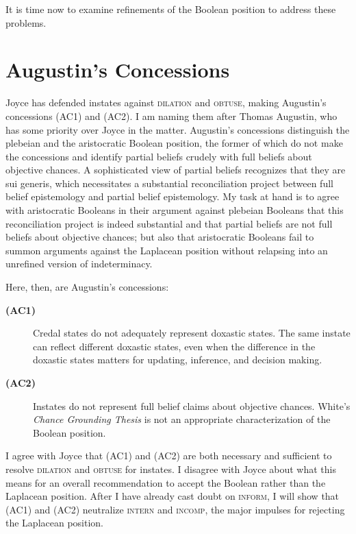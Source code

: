\documentclass[12pt]{article}
\begin{document}
It is time now to examine refinements of the Boolean position to
address these problems.

\section{Augustin's Concessions}
\label{AugustinsConcessions}

Joyce has defended instates against \textsc{dilation} and
\textsc{obtuse}, making Augustin's concessions (AC1) and (AC2). I am
naming them after Thomas Augustin, who has some priority over Joyce in
the matter. Augustin's concessions distinguish the plebeian and the
aristocratic Boolean position, the former of which do not make the
concessions and identify partial beliefs crudely with full beliefs
about objective chances. A sophisticated view of partial beliefs
recognizes that they are sui generis, which necessitates a substantial
reconciliation project between full belief epistemology and partial
belief epistemology. My task at hand is to agree with aristocratic
Booleans in their argument against plebeian Booleans that this
reconciliation project is indeed substantial and that partial beliefs
are not full beliefs about objective chances; but also that
aristocratic Booleans fail to summon arguments against the Laplacean
position without relapsing into an unrefined version of indeterminacy.

Here, then, are Augustin's concessions:

\begin{description}
\item[{\bf (AC1)}] Credal states do not adequately represent doxastic
  states. The same instate can reflect different doxastic states, even
  when the difference in the doxastic states matters for updating,
  inference, and decision making.
\item[{\bf (AC2)}] Instates do not represent full belief claims about
  objective chances. White's \emph{Chance Grounding Thesis} is not an
  appropriate characterization of the Boolean position.
\end{description}

I agree with Joyce that (AC1) and (AC2) are both necessary and
sufficient to resolve \textsc{dilation} and \textsc{obtuse} for
instates. I disagree with Joyce about what this means for an overall
recommendation to accept the Boolean rather than the Laplacean
position. After I have already cast doubt on \textsc{inform}, I will
show that (AC1) and (AC2) neutralize \textsc{intern} and
\textsc{incomp}, the major impulses for rejecting the Laplacean
position. 
\end{document}
